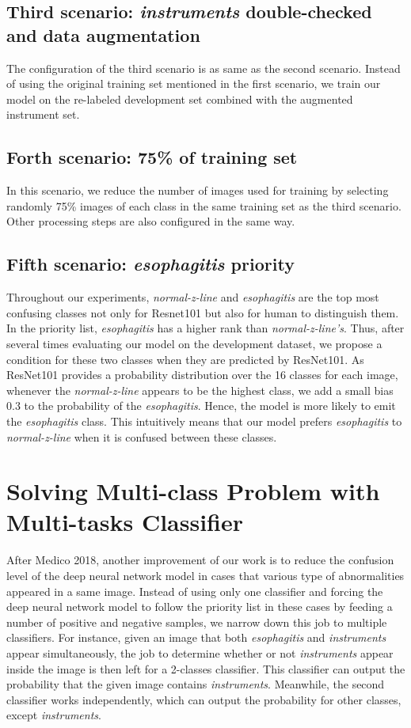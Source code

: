 \subsection{Third scenario: \textit{instruments} double-checked and data augmentation}
The configuration of the third scenario is as same as the second scenario. Instead of using the original training set mentioned in the first scenario, we train our model on the re-labeled development set combined with the augmented instrument set.

\subsection{Forth scenario: 75\% of training set}
In this scenario, we reduce the number of images used for training by selecting randomly 75\% images of each class in the same training set as the third scenario. Other processing steps are also configured in the same way.

\subsection{Fifth scenario: \textit{esophagitis} priority}
Throughout our experiments,
\textit{normal-z-line} and \textit{esophagitis} are the top most confusing classes not only for Resnet101 but also for human to distinguish them. In the priority list, \textit{esophagitis} has a higher rank than \textit{normal-z-line's}. Thus, after several times evaluating our model on the development dataset, we propose a condition for these two classes when they are predicted by ResNet101. As ResNet101 provides a probability distribution over the 16 classes for each image, whenever the 
\textit{normal-z-line} appears to be the highest class, we add a small bias $0.3$ to the probability of the \textit{esophagitis}. Hence, the model is more likely to emit the \textit{esophagitis} class. This intuitively means that our model prefers \textit{esophagitis} to \textit{normal-z-line} when it is confused between these classes.

\section{Solving Multi-class Problem with Multi-tasks Classifier}
\label{sec:multi_task}
After Medico 2018, another improvement of our work is to reduce the confusion level of the deep neural network model in cases that various type of abnormalities appeared in a same image. Instead of using only one classifier and forcing the deep neural network model to follow the priority list in these cases by feeding a number  of positive and negative samples, we narrow down this job to multiple classifiers. For instance, given an image that both \textit{esophagitis} and \textit{instruments} appear simultaneously, the job to determine whether or not \textit{instruments} appear inside the image is then left for a 2-classes classifier. This classifier can output the probability that the  given image contains \textit{instruments}. Meanwhile, the  second classifier works independently, which can output the probability for other classes, except \textit{instruments}.

